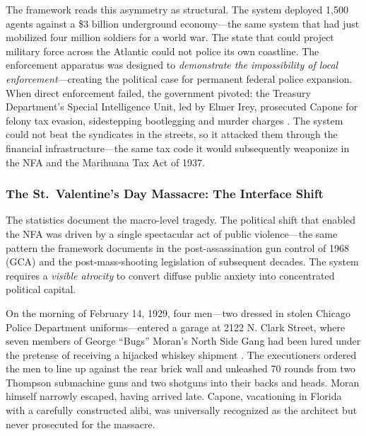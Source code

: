 The framework reads this asymmetry as structural. The system deployed 1,500 agents against a \$3 billion underground economy---the same system that had just mobilized four million soldiers for a world war. The state that could project military force across the Atlantic could not police its own coastline. The enforcement apparatus was designed to \textit{demonstrate the impossibility of local enforcement}---creating the political case for permanent federal police expansion. When direct enforcement failed, the government pivoted: the Treasury Department's Special Intelligence Unit, led by Elmer Irey, prosecuted Capone for felony tax evasion, sidestepping bootlegging and murder charges \cite{fbi_gangster}. The system could not beat the syndicates in the streets, so it attacked them through the financial infrastructure---the same tax code it would subsequently weaponize in the NFA and the Marihuana Tax Act of 1937.

\subsubsection{The St.\ Valentine's Day Massacre: The Interface Shift}

The statistics document the macro-level tragedy. The political shift that enabled the NFA was driven by a single spectacular act of public violence---the same pattern the framework documents in the post-assassination gun control of 1968 (GCA) and the post-mass-shooting legislation of subsequent decades. The system requires a \textit{visible atrocity} to convert diffuse public anxiety into concentrated political capital.

On the morning of February 14, 1929, four men---two dressed in stolen Chicago Police Department uniforms---entered a garage at 2122 N. Clark Street, where seven members of George ``Bugs'' Moran's North Side Gang had been lured under the pretense of receiving a hijacked whiskey shipment \cite{wikipedia_valentine, chicago_valentine, michiganology_valentine}. The executioners ordered the men to line up against the rear brick wall and unleashed 70 rounds from two Thompson submachine guns and two shotguns into their backs and heads. Moran himself narrowly escaped, having arrived late. Capone, vacationing in Florida with a carefully constructed alibi, was universally recognized as the architect but never prosecuted for the massacre.

